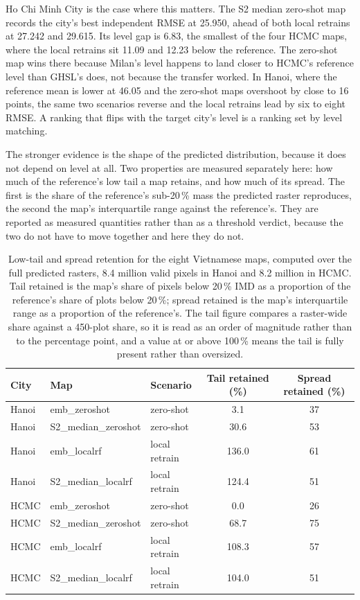 \documentclass[11pt,a4paper]{article}
\begin{document}
Ho Chi Minh City is the case where this matters. The S2 median zero-shot map
records the city's best independent RMSE at 25.950, ahead of both local retrains
at 27.242 and 29.615. Its level gap is 6.83, the smallest of the four HCMC maps,
where the local retrains sit 11.09 and 12.23 below the reference. The zero-shot
map wins there because Milan's level happens to land closer to HCMC's reference
level than GHSL's does, not because the transfer worked. In Hanoi, where the
reference mean is lower at 46.05 and the zero-shot maps overshoot by close to 16
points, the same two scenarios reverse and the local retrains lead by six to
eight RMSE. A ranking that flips with the target city's level is a ranking set by
level matching.

The stronger evidence is the shape of the predicted distribution, because it does
not depend on level at all. Two properties are measured separately here: how much
of the reference's low tail a map retains, and how much of its spread. The first
is the share of the reference's sub-20\,\% mass the predicted raster reproduces,
the second the map's interquartile range against the reference's. They are
reported as measured quantities rather than as a threshold verdict, because the
two do not have to move together and here they do not.

\begin{table}[htbp]
  \centering
  \caption{Low-tail and spread retention for the eight Vietnamese maps, computed
  over the full predicted rasters, 8.4 million valid pixels in Hanoi and 8.2
  million in HCMC. Tail retained is the map's share of pixels below 20\,\% IMD as a
  proportion of the reference's share of plots below 20\,\%; spread retained is the
  map's interquartile range as a proportion of the reference's. The tail figure
  compares a raster-wide share against a 450-plot share, so it is read as an order
  of magnitude rather than to the percentage point, and a value at or above
  100\,\% means the tail is fully present rather than oversized.}
  \label{tab:tail-spread}
  \begin{tabular}{l l l S[table-format=3.1] S[table-format=2.0]}
    \toprule
    {City} & {Map} & {Scenario} & {Tail retained (\%)} & {Spread retained (\%)} \\
    \midrule
    Hanoi & emb\_zeroshot        & zero-shot     & 3.1   & 37 \\
    Hanoi & S2\_median\_zeroshot & zero-shot     & 30.6  & 53 \\
    Hanoi & emb\_localrf         & local retrain & 136.0 & 61 \\
    Hanoi & S2\_median\_localrf  & local retrain & 124.4 & 51 \\
    HCMC  & emb\_zeroshot        & zero-shot     & 0.0   & 26 \\
    HCMC  & S2\_median\_zeroshot & zero-shot     & 68.7  & 75 \\
    HCMC  & emb\_localrf         & local retrain & 108.3 & 57 \\
    HCMC  & S2\_median\_localrf  & local retrain & 104.0 & 51 \\
    \bottomrule
  \end{tabular}
\end{table}
\end{document}
